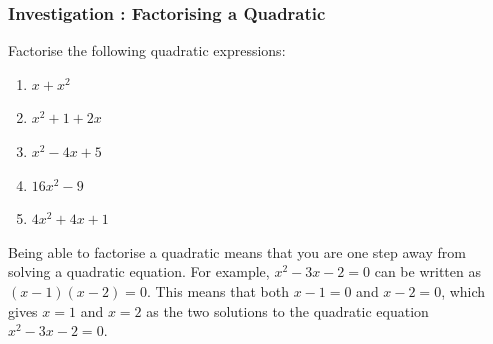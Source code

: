             \subsubsection{  Investigation : Factorising a Quadratic }
            \nopagebreak
            
      \label{m39247*id149660}Factorise the following
quadratic expressions:\par 
      \label{m39247*id149666}\begin{enumerate}[noitemsep, label=\textbf{\arabic*}. ] 
            \label{m39247*uid31}\item 
          \begin{math}x+{x}^{2}\end{math}
        \label{m39247*uid32}\item 
          \begin{math}{x}^{2}+1+2x\end{math}
        \label{m39247*uid33}\item 
          \begin{math}{x}^{2}-4x+5\end{math}
        \label{m39247*uid34}\item 
          \begin{math}16{x}^{2}-9\end{math}
        \label{m39247*uid35}\item 
          \begin{math}4{x}^{2}+4x+1\end{math}
        \end{enumerate}
        
      

      \label{m39247*id149848}Being able to factorise a quadratic means that you are one step away from
solving a quadratic equation. For example, \begin{math}{x}^{2}-3x-2=0\end{math} can be written as
\begin{math}\left(x-1\right)\left(x-2\right)=0\end{math}. This means that both \begin{math}x-1=0\end{math} and \begin{math}x-2=0\end{math}, which gives \begin{math}x=1\end{math} and
\begin{math}x=2\end{math} as the two solutions to the quadratic equation \begin{math}{x}^{2}-3x-2=0\end{math}.\par 
      \label{m39247*uid36}
